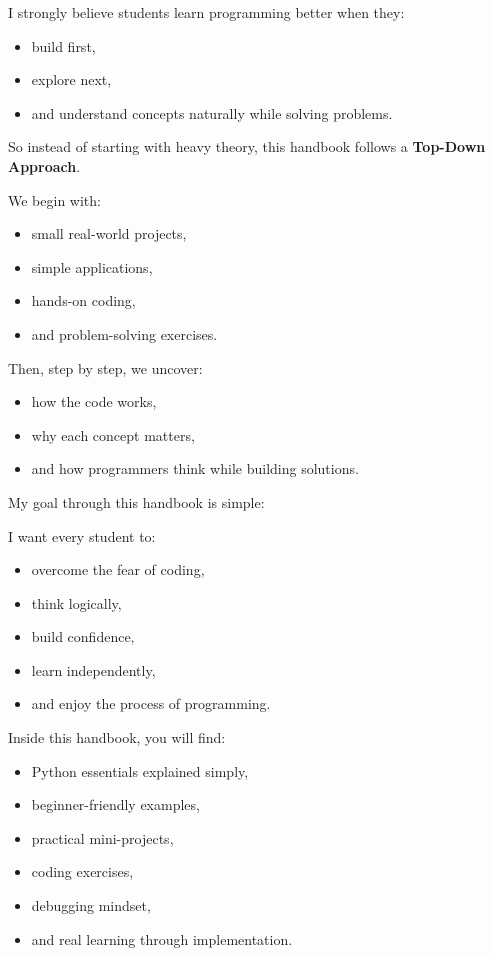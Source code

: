 \documentclass[
  letterpaper,
  DIV=11,
  numbers=noendperiod]{scrreprt}
\providecommand{\tightlist}{%
  \setlength{\itemsep}{0pt}\setlength{\parskip}{0pt}}
\begin{document}
I strongly believe students learn programming better when they:

\begin{itemize}
\tightlist
\item
  build first,
\item
  explore next,
\item
  and understand concepts naturally while solving problems.
\end{itemize}

So instead of starting with heavy theory, this handbook follows a
\textbf{Top-Down Approach}.

We begin with:

\begin{itemize}
\tightlist
\item
  small real-world projects,
\item
  simple applications,
\item
  hands-on coding,
\item
  and problem-solving exercises.
\end{itemize}

Then, step by step, we uncover:

\begin{itemize}
\tightlist
\item
  how the code works,
\item
  why each concept matters,
\item
  and how programmers think while building solutions.
\end{itemize}

My goal through this handbook is simple:

I want every student to:

\begin{itemize}
\tightlist
\item
  overcome the fear of coding,
\item
  think logically,
\item
  build confidence,
\item
  learn independently,
\item
  and enjoy the process of programming.
\end{itemize}

Inside this handbook, you will find:

\begin{itemize}
\tightlist
\item
  Python essentials explained simply,
\item
  beginner-friendly examples,
\item
  practical mini-projects,
\item
  coding exercises,
\item
  debugging mindset,
\item
  and real learning through implementation.
\end{itemize}
\end{document}
